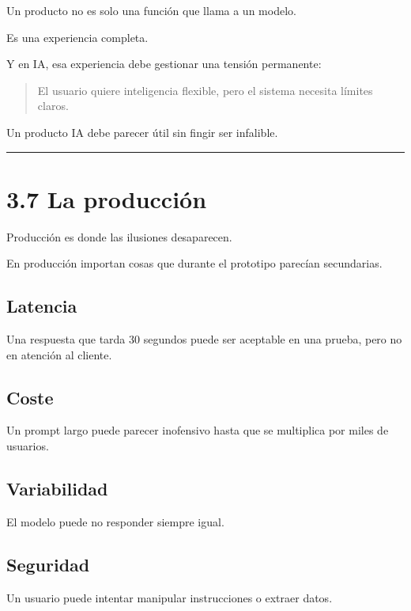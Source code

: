 Un producto no es solo una función que llama a un modelo.

Es una experiencia completa.

Y en IA, esa experiencia debe gestionar una tensión permanente:

\begin{quote}
El usuario quiere inteligencia flexible, pero el sistema necesita
límites claros.
\end{quote}

Un producto IA debe parecer útil sin fingir ser infalible.

\begin{center}\rule{0.5\linewidth}{0.5pt}\end{center}

\section{3.7 La producción}\label{la-producciuxf3n}

Producción es donde las ilusiones desaparecen.

En producción importan cosas que durante el prototipo parecían
secundarias.

\subsection{Latencia}\label{latencia}

Una respuesta que tarda 30 segundos puede ser aceptable en una prueba,
pero no en atención al cliente.

\subsection{Coste}\label{coste}

Un prompt largo puede parecer inofensivo hasta que se multiplica por
miles de usuarios.

\subsection{Variabilidad}\label{variabilidad}

El modelo puede no responder siempre igual.

\subsection{Seguridad}\label{seguridad}

Un usuario puede intentar manipular instrucciones o extraer datos.

